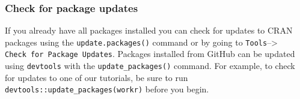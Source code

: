 \documentclass[
]{article}
\begin{document}
\hypertarget{check-for-package-updates}{%
\subsubsection{Check for package
updates}\label{check-for-package-updates}}

If you already have all packages installed you can check for updates to
CRAN packages using the \texttt{update.packages()} command or by going
to \texttt{Tools}--\textgreater{} \texttt{Check\ for\ Package\ Updates}.
Packages installed from GitHub can be updated using \texttt{devtools}
with the \texttt{update\_packages()} command. For example, to check for
updates to one of our tutorials, be sure to run
\texttt{devtools::update\_packages(workr)} before you begin.
\end{document}
